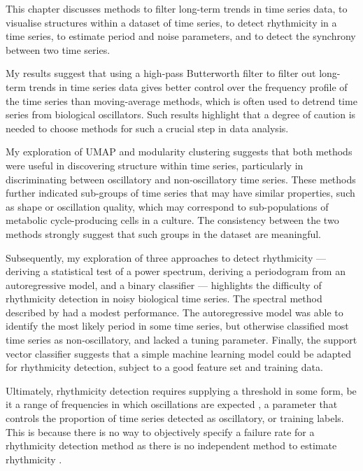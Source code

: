 This chapter discusses methods to filter long-term trends in time series data, to visualise structures within a dataset of time series, to detect rhythmicity in a time series, to estimate period and noise parameters, and to detect the synchrony between two time series.

My results suggest that using a high-pass Butterworth filter to filter out long-term trends in time series data gives better control over the frequency profile of the time series than moving-average methods, which is often used to detrend time series from biological oscillators.
Such results highlight that a degree of caution is needed to choose methods for such a crucial step in data analysis.

My exploration of UMAP and modularity clustering suggests that both methods were useful in discovering structure within time series, particularly in discriminating between oscillatory and non-oscillatory time series.
These methods further indicated sub-groups of time series that may have similar properties, such as shape or oscillation quality, which may correspond to sub-populations of metabolic cycle-producing cells in a culture.
The consistency between the two methods strongly suggest that such groups in the dataset are meaningful.

Subsequently, my exploration of three approaches to detect rhythmicity --- deriving a statistical test of a power spectrum, deriving a periodogram from an autoregressive model, and a binary classifier --- highlights the difficulty of rhythmicity detection in noisy biological time series.
The spectral method described by \textcite{glynnDetectingPeriodicPatterns2006} had a modest performance.
The autoregressive model was able to identify the most likely period in some time series, but otherwise classified most time series as non-oscillatory, and lacked a tuning parameter.
Finally, the support vector classifier suggests that a simple machine learning model could be adapted for rhythmicity detection, subject to a good feature set and training data.

Ultimately, rhythmicity detection requires supplying a threshold in some form, be it a range of frequencies in which oscillations are expected \parencite{zielinskiStrengthsLimitationsPeriod2014}, a parameter that controls the proportion of time series detected as oscillatory, or training labels.
This is because there is no way to objectively specify a failure rate for a rhythmicity detection method as there is no independent method to estimate rhythmicity \parencite{zielinskiStrengthsLimitationsPeriod2014}.

